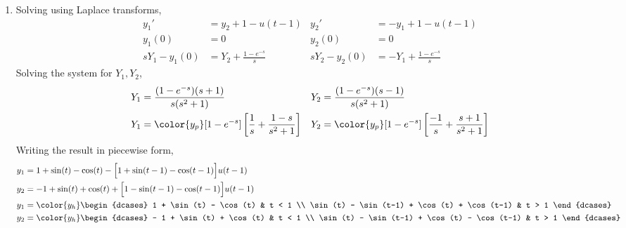 \begin{enumerate}
    \item Solving using Laplace transforms,
          \begin{align}
              y_1'          & = y_2 + 1 - u(t-1)            &
              y_2'          & = -y_1 + 1 - u(t-1)             \\
              y_1(0)        & = 0                           &
              y_2(0)        & = 0                             \\
              sY_1 - y_1(0) & = Y_2 + \frac{1- e^{-s}}{s}   &
              sY_2 - y_2(0) & = -Y_1 + \frac{1 - e^{-s}}{s}
          \end{align}
          Solving the system for $ Y_1, Y_2 $,
          \begin{align}
              Y_1                         & = \frac{(1 - e^{-s})(s+1)}
              {s(s^2 + 1)}                &
              Y_2                         & = \frac{(1 - e^{-s})(s-1)}
              {s(s^2+1)}                                                     \\
              Y_1                         & = \color{y_p} [1 - e^{-s}]\left[
                  \frac{1}{s} +
              \frac{1 - s}{s^2+1} \right] &
              Y_2                         & = \color{y_p} [1 - e^{-s}]\left[
                  \frac{-1}{s} +
              \frac{s+1}{s^2+1} \right]                                      \\
          \end{align}
          Writing the result in piecewise form,
          \begin{align}
              y_1 & = 1 + \sin(t) - \cos(t)
              - \Big[ 1 + \sin(t-1) - \cos(t-1) \Big] u(t-1)    \\
              y_2 & = -1 + \sin(t) + \cos(t)
              + \Big[ 1 - \sin(t-1) - \cos(t-1) \Big] u(t-1)    \\
              y_1 & = \color{y_h}
              \begin{dcases}
                  1 + \sin(t) - \cos(t)                     & t < 1 \\
                  \sin(t) - \sin(t-1) + \cos(t) + \cos(t-1) & t > 1
              \end{dcases} \\
              y_2 & = \color{y_h}
              \begin{dcases}
                  - 1 + \sin(t) + \cos(t)                   & t < 1 \\
                  \sin(t) - \sin(t-1) + \cos(t) - \cos(t-1) & t > 1
              \end{dcases}
          \end{align}


\end{enumerate}
